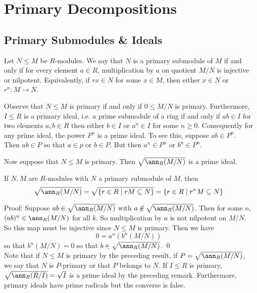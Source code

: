 
\newpage
\section{Primary Decompositions} 

\subsection{Primary Submodules \& Ideals}

\begin{dfn}
Let $N \leq M$ be $R$-modules. We say that $N$ is a primary submodule of $M$ if and only if for every element $a \in R$, multiplication by $a$ on quotient $M/N$ is injective or nilpotent. Equivalently, if $rx \in N$ for some $x \in M$, then either $x \in N$ or $r^n: M \to N$. 
\end{dfn}

Observe that $N \leq M$ is primary if and only if $0 \leq M/N$ is primary. Furthermore, $I \leq R$ is a primary ideal, i.e. a prime submodule of a ring if and only if $ab \in I$ for two elements $a,b \in R$ then either $b \in I$ or $a^n \in I$ for some $n \geq 0$. Consequently for any prime ideal, the power $P^n$ is a prime ideal. To see this, suppose $ab \in P^n$. Then $ab \in P$ so that $a \in p$ or $b \in P$. But then $a^n \in P^n$ or $b^n \in P^n$. 

Now suppose that $N \leq M$ is primary. Then $\sqrt{\ann_R(M/N)}$ is a prime ideal.

\begin{prop}
If $N,M$ are $R$-modules with $N$ a primary submodule of $M$, then
\[
\sqrt{\ann_R(M/N)}=\sqrt{\{r \in R \;|\; rM \subseteq N\}}=\{r \in R\;|\; r^nM \subseteq N\}
\]
\end{prop}

\noindent Proof: Suppose $ab \in \sqrt{\ann_R(M/N)}$ with $a \notin \sqrt{\ann_R(M/N)}$. Then for some $n$, $(ab)^n \in \ann_R(M/N)$ for all $k$. So multiplication by $a$ is not nilpotent on $M/N$. So this map must be injective since $N \leq M$ is primary. Then we have
\[
0=a^n(b^n(M/N))
\]
so that $b^n(M/N)=0$ so that $b \in \sqrt{\ann_R(M/N)}$. \qed \\

Note that if $N \leq M$ is primary by the preceding result, if $P= \sqrt{\ann_R(M/N)}$, we say that $N$ is $P$-primary or that $P$ belongs to $N$. If $I \leq R$ is primary, $\sqrt{\ann_R(R/I)}=\sqrt{I}$ is a prime ideal by the preceding remark. Furthermore, primary ideals have prime radicals but the converse is false.

